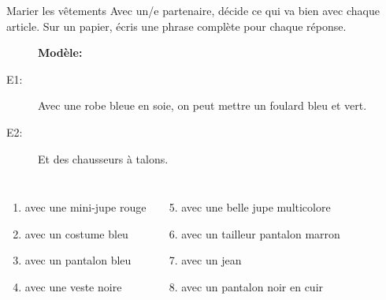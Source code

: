\begin{frame}{Marier les vêtements}
  Avec un/e partenaire, décide ce qui va bien avec chaque article.
  Sur un papier, écris une phrase complète pour chaque réponse. \\
  \begin{description}
    \item[] \textbf{Modèle:} 
    \item[E1:] Avec une robe bleue en soie, on peut mettre un foulard bleu et vert.
    \item[] 
    \item[E2:] Et des chausseurs à talons.
    \item[] 
  \end{description}
  \begin{columns}
      \begin{enumerate}
        \item avec une mini-jupe rouge
        \item avec un costume bleu
        \item avec un pantalon bleu
        \item avec une veste noire
      \end{enumerate}
      \begin{enumerate}
        \setcounter{enumi}{4}
        \item avec une belle jupe multicolore
        \item avec un tailleur pantalon marron
        \item avec un jean
        \item avec un pantalon noir en cuir
      \end{enumerate}
  \end{columns}
\end{frame}